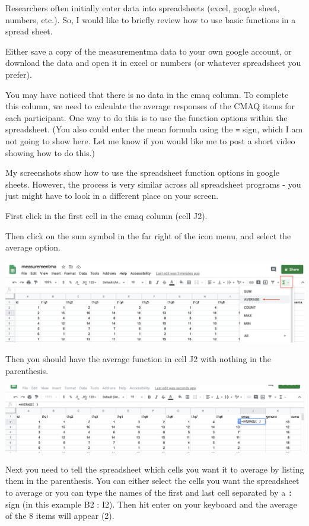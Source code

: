 \documentclass[
]{book}
\begin{document}
Researchers often initially enter data into spreadsheets (excel, google sheet, numbers, etc.). So, I would like to briefly review how to use basic functions in a spread sheet.

Either save a copy of the measurementma data to your own google account, or download the data and open it in excel or numbers (or whatever spreadsheet you prefer).

You may have noticed that there is no data in the cmaq column. To complete this column, we need to calculate the average responses of the CMAQ items for each participant. One way to do this is to use the function options within the spreadsheet. (You also could enter the mean formula using the \texttt{=} sign, which I am not going to show here. Let me know if you would like me to post a short video showing how to do this.)

My screenshots show how to use the spreadsheet function options in google sheets. However, the process is very similar across all spreadsheet programs - you just might have to look in a different place on your screen.

First click in the first cell in the cmaq column (cell J2).

Then click on the sum symbol in the far right of the icon menu, and select the average option.

\includegraphics{img/averagefun.png}

Then you should have the average function in cell J2 with nothing in the parenthesis.

\includegraphics{img/averagefun2.png}

Next you need to tell the spreadsheet which cells you want it to average by listing them in the parenthesis. You can either select the cells you want the spreadsheet to average or you can type the names of the first and last cell separated by a \texttt{:} sign (in this example B2 : I2). Then hit enter on your keyboard and the average of the 8 items will appear (2).
\end{document}
